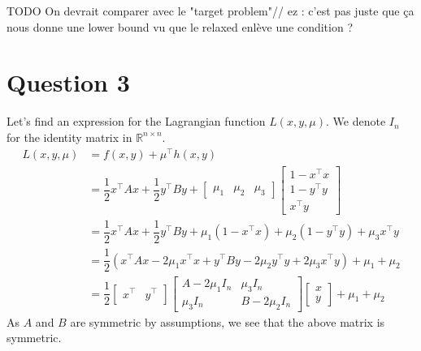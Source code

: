 \documentclass{article}
\newcommand{\R}{\mathbb{R}}
\newcommand{\tp}{^\top}
\newcommand{\fxy}{\dfrac{1}{2}x\tp A x + \dfrac{1}{2} y\tp B y}
\newcommand{\hxy}{\begin{bmatrix}
1-x\tp x\\
1-y\tp y\\
x\tp y
\end{bmatrix}}
\begin{document}
TODO On devrait comparer avec le "target problem"//
ez : c'est pas juste que ça nous donne une lower bound vu que le relaxed enlève une condition ?

\section*{Question 3}
Let's find an expression for the Lagrangian function $L(x,y,\mu)$. We denote $I_n$ for the identity matrix in $\R^{n\times n}$.
\begin{align*}
L(x,y,\mu) &= f(x,y)+\mu\tp h(x,y) \\
&=\fxy  + \begin{bmatrix} \mu_1 &\mu_2 & \mu_3 \end{bmatrix} \hxy \\
&=\fxy + \mu_1(1-x\tp x) +\mu_2(1-y\tp y) + \mu_3 x\tp y \\
&= \dfrac{1}{2}\left(x\tp A x - 2\mu_1 x\tp x +  y\tp B y -2\mu_2 y\tp y + 2\mu_3 x\tp y\right) + \mu_1+\mu_2 \\
&= \dfrac{1}{2} \begin{bmatrix} x\tp & y\tp\end{bmatrix}
\begin{bmatrix} A-2\mu_1 I_n & \mu_3 I_n \\
\mu_3 I_n & B-2\mu_2 I_n \end{bmatrix}
\begin{bmatrix} x \\ y \end{bmatrix} +\mu_1+\mu_2 
\end{align*}
As $A$ and $B$ are symmetric by assumptions, we see that the above matrix is symmetric.
\end{document}
